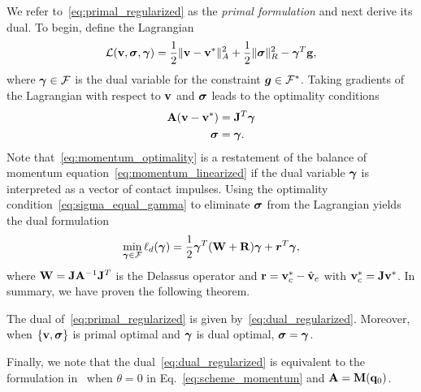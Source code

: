 We refer to~\eqref{eq:primal_regularized} as the \emph{primal formulation}
and next derive its dual. To begin, define the Lagrangian
\begin{equation}
    \mathcal{L}({\mathbf{v}},{\bm\sigma},{\bm{\gamma}}) = 
\frac{1}{2}\Vert{\mathbf{v}}-{\mathbf{v}}^*\Vert_A^2 + \frac{1}{2} \Vert{\bm\sigma}\Vert_{R}^2 - {\bm{\gamma}}^T{\mathbf{g}},
\end{equation}
where ${\bm{\gamma}}\in\mathcal{F}$ is the dual variable for the constraint
${\bm{g}}\in \mathcal{F}^*$. Taking gradients of the Lagrangian with respect to ${\mathbf{v}}$ and ${\bm\sigma}$ leads
to the optimality conditions
\begin{subequations}\label{eq:primal_optimality_conditions}
\begin{align}
    \mf{A}(\mf{v}-\mf{v}^*) &= \mf{J}^T\vf{\gamma} \label{eq:momentum_optimality}\\
    \vf{\sigma} &= \vf{\gamma}.  \label{eq:sigma_equal_gamma}
\end{align}
\end{subequations}
Note that~\eqref{eq:momentum_optimality} is a restatement
of the balance of momentum equation~\eqref{eq:momentum_linearized}
if the dual variable ${\bm\gamma}$ is interpreted as a vector of contact impulses. 
 Using the optimality
condition~\eqref{eq:sigma_equal_gamma} to eliminate ${\bm{\sigma}}$ from the
Lagrangian yields the dual formulation
\begin{align}
    \min_{\bgamma\in \mathcal{F}} \ell_d(\bgamma) =
    \frac{1}{2}\bgamma^T(\mathbf{W}+\mathbf{R})\bgamma + {\bm r}^T
    \bgamma,
	\label{eq:dual_regularized}
\end{align}
where ${\mathbf{W}}={\mathbf{J}}{\mathbf{A}}^{-1}{\mathbf{J}}^T$ is the Delassus operator and
${\mathbf{r}}={\mathbf{v}}_c^*-\hat{{\mathbf{v}}}_c$ with ${\mathbf{v}}_c^*={\mathbf{J}}{\mathbf{v}}^*$.
In summary, we have proven the following theorem.
\begin{theorem}\label{th:primal_dual} The dual of~\eqref{eq:primal_regularized}
	is given by~\eqref{eq:dual_regularized}. Moreover, when $\{{\mathbf{v}},{\bm\sigma}\}$ is
	primal optimal and ${\bm\gamma}$ is dual optimal, ${\bm\sigma} = {\bm\gamma}$.
\end{theorem}

Finally, we note that the dual~\eqref{eq:dual_regularized} is equivalent to the
formulation in~\cite{bib:todorov2011} when $\theta = 0$ in
Eq.~\eqref{eq:scheme_momentum} and ${\mathbf{A}}={\mathbf{M}}({\mathbf{q}}_0)$. 

